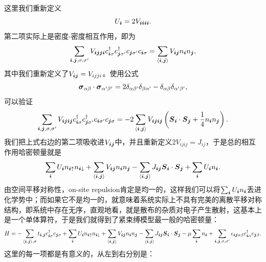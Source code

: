这里我们重新定义
\begin{equation}
    U_{\vb*{i}} = 2 V_{\vb*{i} \vb*{i} \vb*{i} \vb*{i}}.
\end{equation}
第二项实际上是密度-密度相互作用，即为
\[
    \sum_{\vb*{i}, \vb*{j}, \sigma, \sigma'} V_{\vb*{i} \vb*{j} \vb*{j} \vb*{i}} c^\dagger_{\vb*{i} \sigma} c^\dagger_{\vb*{j} \sigma'} c_{\vb*{j} \sigma'} c_{\vb*{i} \sigma} = \sum_{\langle \vb*{i}, \vb*{j} \rangle} V_{\vb*{i} \vb*{j}}n_{\vb*{i}} n_{\vb*{j}},
\]
其中我们重新定义了$V_{\vb*{i} \vb*{j}} = V_{ijji}$。使用公式
\[
    \vb*{\sigma}_{\alpha \beta} \cdot \vb*{\sigma}_{\alpha' \beta'} = 2 \delta_{\alpha \beta'} \delta_{\beta \alpha'} - \delta_{\alpha \beta} \delta_{\alpha' \beta'},
\]
可以验证
\[
    \sum_{\vb*{i}, \vb*{j}, \sigma, \sigma'} V_{\vb*{i} \vb*{j} \vb*{i} \vb*{j}} c^\dagger_{\vb*{i} \sigma} c^\dagger_{\vb*{j} \sigma'} c_{\vb*{i} \sigma'} c_{\vb*{j} \sigma} = - 2 \sum_{\langle \vb*{i}, \vb*{j} \rangle} V_{\vb*{i} \vb*{j} \vb*{i} \vb*{j}} \left( \vb*{S}_{\vb*{i}} \cdot \vb*{S}_{\vb*{j}} + \frac{1}{4}n_{\vb*{i}} n_{\vb*{j}} \right).
\]
我们把上式右边的第二项吸收进$V_{\vb*{i} \vb*{j}}$中，并且重新定义$2V_{ijij}=J_{ij}$，于是总的相互作用哈密顿量就是
\[
    \sum_{\vb*{i}} U_{\vb*{i}} n_{\vb*{i} \uparrow} n_{\vb*{i} \downarrow} + \sum_{\langle \vb*{i}, \vb*{j} \rangle} V_{\vb*{i} \vb*{j}}n_{\vb*{i}} n_{\vb*{j}} - \sum_{\langle \vb*{i}, \vb*{j} \rangle} J_{\vb*{i} \vb*{j}} \vb*{S}_{\vb*{i}} \cdot \vb*{S}_{\vb*{j}} + \sum_{\vb*{i}} U_{\vb*{i}}n_{\vb*{i}}.
\]
由空间平移对称性，on-site repulsion肯定是均一的，这样我们可以将$\sum_{\vb*{i}} U_{\vb*{i}}n_{\vb*{i}}$丢进化学势中；而如果它不是均一的，就意味着系统实际上不具有完美的离散平移对称结构，即系统中存在无序，直观地看，就是散布的杂质对电子产生散射，这基本上是一个单体算符，于是我们就得到了紧束缚模型最一般的哈密顿量：
\begin{equation}
    H = - \sum_{\langle \vb*{i}, \vb*{j} \rangle, \sigma} t_{\vb*{i}, \vb*{j}} c^\dagger_{\vb*{i} \sigma} c_{\vb*{j} \sigma} 
    + \sum_{\vb*{i}} U_{\vb*{i}} n_{\vb*{i} \uparrow} n_{\vb*{i} \downarrow} 
    + \sum_{\langle \vb*{i}, \vb*{j} \rangle} V_{\vb*{i} \vb*{j}} n_{\vb*{i}} n_{\vb*{j}} - \sum_{\langle \vb*{i}, \vb*{j} \rangle} J_{\vb*{i} \vb*{j}} \vb*{S}_{\vb*{i}} \cdot \vb*{S}_{\vb*{j}} 
    - \mu \sum_{\vb*{i}} n_{\vb*{i}} + \sum_{\vb*{i}, \vb*{j}, \sigma, \sigma'} \epsilon_{\vb*{i} \vb*{j} \alpha \beta} c^\dagger_{\vb*{i} \alpha} c_{\vb*{j} \beta}.  
    \label{eq:tight-binding-single-band-interaction}
\end{equation}
这里的每一项都是有意义的，从左到右分别是：
